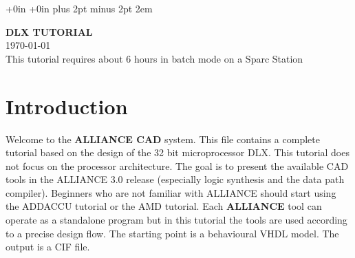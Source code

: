 
\textheight 9.0in
\textwidth  7.0in
\topmargin  -0.0in
\oddsidemargin  +0in
\evensidemargin -0in
\marginparwidth +0in
\parskip 8pt plus 2pt minus 2pt     %
\parindent 2em                      %
\topsep 0pt                         %
\parsep 6pt                         %
\partopsep 0pt                      %
\itemsep 0pt                        %
\def\Sup{\verb+>+}
\def\Inf{\verb+<+}
\newlength{\mylength}
\def\S#1{\protect\makebox[\mylength][l]{\noindent#1}}
 


\begin{center}
{\Large \bf DLX TUTORIAL}\\
\today \\
This tutorial requires about 6 hours in batch mode on a Sparc Station
\end{center}

\section{Introduction}

\hspace{\parindent}
 Welcome to the {\bf ALLIANCE CAD} system.
This file contains a complete tutorial based on the design of the 32 bit microprocessor DLX.
This tutorial does not focus on the processor architecture. The
goal is to present the available CAD tools in the ALLIANCE 3.0 release (especially
logic synthesis and the data path compiler).
Beginners who are not familiar with ALLIANCE should start using the
ADDACCU tutorial or the AMD tutorial.
Each {\bf ALLIANCE} tool can operate as a standalone program but in this
tutorial the tools are used according to a precise design flow.
The starting point is a behavioural VHDL model. The output is a CIF file.

